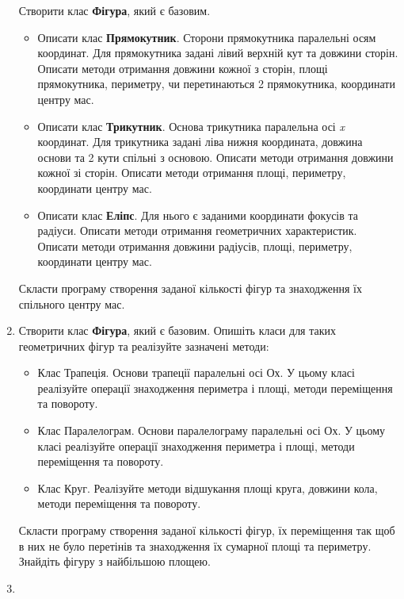 \documentclass[a5paper,titlepage,openany,twoside,draft]{book_unv}%
\begin{document}
\begin{enumerate}
Створити клас \textbf{Фігура}, який є базовим.
\begin{itemize}
\item
Описати клас \textbf{Прямокутник}. Сторони прямокутника паралельні осям
координат. Для прямокутника задані лівий верхній кут та довжини сторін.
Описати методи отримання довжини кожної з сторін, площі прямокутника,
периметру, чи перетинаються 2 прямокутника, координати центру мас. 
\item
Описати клас \textbf{Трикутник}. Основа трикутника паралельна осі
\emph{x} координат. Для трикутника задані ліва нижня координата,
довжина основи та 2 кути спільні з основою. Описати методи отримання довжини кожної зі сторін.
Описати методи отримання площі, периметру, координати центру мас.  
\item
Описати клас \textbf{Еліпс}. Для нього є заданими координати фокусів та радіуси.
Описати методи отримання геометричних характеристик. Описати методи
отримання довжини радіусів, площі, периметру, координати центру мас. 
\end{itemize}

Скласти програму створення заданої кількості фігур та знаходження їх спільного центру мас.


\item
Створити клас \textbf{Фігура}, який є базовим.  Опишіть класи для 
таких геометричних фігур та реалізуйте зазначені методи:
\begin{itemize}
\item
  Клас Трапеція. Основи трапеції паралельні осі Ох. У цьому класі реалізуйте операції 
знаходження периметра і площі, методи переміщення та повороту.
\item
  Клас Паралелограм. Основи паралелограму паралельні осі Ох. 
У цьому класі реалізуйте операції знаходження периметра і площі, 
методи переміщення та повороту.
\item
  Клас Круг. Реалізуйте методи відшукання площі круга, довжини кола,
  методи переміщення та повороту.
\end{itemize}
Скласти програму створення заданої кількості фігур, їх переміщення так щоб в них не було
перетінів та знаходження їх сумарної площі та периметру. 
Знайдіть фігуру з найбільшою площею.


\item


\end{enumerate}
\end{document}
